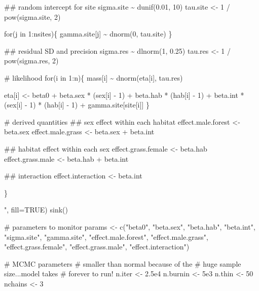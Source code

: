 \documentclass[
  13,
  letterpaper,
]{report}
\newenvironment{Shaded}{\begin{snugshade}}{\end{snugshade}}
\newcommand{\AttributeTok}[1]{\textcolor[rgb]{0.40,0.45,0.13}{#1}}
\newcommand{\CommentTok}[1]{\textcolor[rgb]{0.37,0.37,0.37}{#1}}
\newcommand{\ConstantTok}[1]{\textcolor[rgb]{0.56,0.35,0.01}{#1}}
\newcommand{\DecValTok}[1]{\textcolor[rgb]{0.68,0.00,0.00}{#1}}
\newcommand{\FloatTok}[1]{\textcolor[rgb]{0.68,0.00,0.00}{#1}}
\newcommand{\FunctionTok}[1]{\textcolor[rgb]{0.28,0.35,0.67}{#1}}
\newcommand{\NormalTok}[1]{\textcolor[rgb]{0.00,0.23,0.31}{#1}}
\newcommand{\OtherTok}[1]{\textcolor[rgb]{0.00,0.23,0.31}{#1}}
\newcommand{\StringTok}[1]{\textcolor[rgb]{0.13,0.47,0.30}{#1}}
\begin{document}
\begin{Shaded}
\begin{Highlighting}[]
\StringTok{    \#\# random intercept for site}
\StringTok{    sigma.site \textasciitilde{} dunif(0.01, 10)}
\StringTok{    tau.site \textless{}{-} 1 / pow(sigma.site, 2)}

\StringTok{    for(j in 1:nsites)\{}
\StringTok{        gamma.site[j] \textasciitilde{} dnorm(0, tau.site)}
\StringTok{    \}}

\StringTok{    \#\# residual SD and precision}
\StringTok{    sigma.res \textasciitilde{} dlnorm(1, 0.25)}
\StringTok{    tau.res \textless{}{-} 1 / pow(sigma.res, 2)}

\StringTok{    \# likelihood}
\StringTok{    for(i in 1:n)\{}
\StringTok{        mass[i] \textasciitilde{} dnorm(eta[i], tau.res)}

\StringTok{        eta[i] \textless{}{-} beta0 +}
\StringTok{                  beta.sex * (sex[i] {-} 1) +}
\StringTok{                  beta.hab * (hab[i] {-} 1) +}
\StringTok{                  beta.int * (sex[i] {-} 1) * (hab[i] {-} 1) +}
\StringTok{                  gamma.site[site[i]]}
\StringTok{    \}}

\StringTok{    \# derived quantities}
\StringTok{    \#\# sex effect within each habitat}
\StringTok{    effect.male.forest \textless{}{-} beta.sex}
\StringTok{    effect.male.grass \textless{}{-} beta.sex + beta.int}

\StringTok{    \#\# habitat effect within each sex}
\StringTok{    effect.grass.female \textless{}{-} beta.hab}
\StringTok{    effect.grass.male \textless{}{-} beta.hab + beta.int}

\StringTok{    \#\# interaction}
\StringTok{    effect.interaction \textless{}{-} beta.int}


\StringTok{\}}


\StringTok{"}\NormalTok{, }\AttributeTok{fill=}\ConstantTok{TRUE}\NormalTok{)}
\FunctionTok{sink}\NormalTok{()}

\CommentTok{\# parameters to monitor}
\NormalTok{params }\OtherTok{\textless{}{-}} \FunctionTok{c}\NormalTok{(}\StringTok{"beta0"}\NormalTok{, }\StringTok{"beta.sex"}\NormalTok{, }\StringTok{"beta.hab"}\NormalTok{, }\StringTok{"beta.int"}\NormalTok{,}
            \StringTok{"sigma.site"}\NormalTok{, }\StringTok{"gamma.site"}\NormalTok{,}
            \StringTok{"effect.male.forest"}\NormalTok{, }\StringTok{"effect.male.grass"}\NormalTok{, }
            \StringTok{"effect.grass.female"}\NormalTok{, }\StringTok{"effect.grass.male"}\NormalTok{,}
            \StringTok{"effect.interaction"}\NormalTok{)}

\CommentTok{\# MCMC parameters}
\CommentTok{\# smaller than normal because of the}
\CommentTok{\# huge sample size...model takes}
\CommentTok{\# forever to run!}
\NormalTok{n.iter }\OtherTok{\textless{}{-}} \FloatTok{2.5e4}
\NormalTok{n.burnin }\OtherTok{\textless{}{-}} \FloatTok{5e3}
\NormalTok{n.thin }\OtherTok{\textless{}{-}} \DecValTok{50}
\NormalTok{nchains }\OtherTok{\textless{}{-}} \DecValTok{3}


\end{Highlighting}
\end{Shaded}
\end{document}
